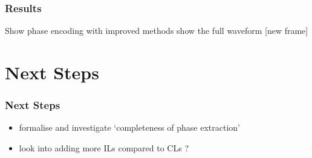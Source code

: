 \documentclass{beamer}
\begin{document}
\begin{frame}
\frametitle{Results}
Show phase encoding with improved methods 
show the full waveform [new frame]
\end{frame}

\section{Next Steps}

\begin{frame}
\frametitle{Next Steps}
\begin{itemize}
\item formalise and investigate `completeness of phase extraction' 
\item look into adding more ILs compared to CLs ?
\end{itemize}
\end{frame}
\end{document}
